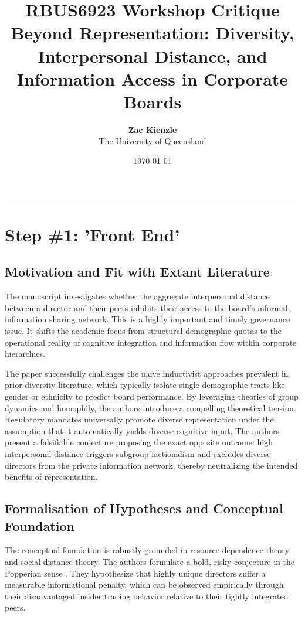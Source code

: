 \documentclass[11pt, a4paper]{article}
\title{\vspace{-2cm}\textbf{\color{uqpurple}RBUS6923 Workshop Critique}\\ \Large Beyond Representation: Diversity, Interpersonal Distance, and Information Access in Corporate Boards}
\author{\textbf{Zac Kienzle} \\ The University of Queensland}
\date{\today}
\begin{document}
\maketitle
\vspace{-1cm}
\rule{\textwidth}{0.4pt}
\vspace{0.5cm}

\section*{Step \#1: 'Front End'}

\subsection*{Motivation and Fit with Extant Literature}
The manuscript investigates whether the aggregate interpersonal distance between a director and their peers inhibits their access to the board's informal information sharing network. This is a highly important and timely governance issue. It shifts the academic focus from structural demographic quotas to the operational reality of cognitive integration and information flow within corporate hierarchies.

The paper successfully challenges the naive inductivist approaches prevalent in prior diversity literature, which typically isolate single demographic traits like gender or ethnicity to predict board performance. By leveraging theories of group dynamics and homophily, the authors introduce a compelling theoretical tension. Regulatory mandates universally promote diverse representation under the assumption that it automatically yields diverse cognitive input. The authors present a falsifiable conjecture proposing the exact opposite outcome: high interpersonal distance triggers subgroup factionalism and excludes diverse directors from the private information network, thereby neutralizing the intended benefits of representation.

\subsection*{Formalisation of Hypotheses and Conceptual Foundation}
The conceptual foundation is robustly grounded in resource dependence theory and social distance theory. The authors formulate a bold, risky conjecture in the Popperian sense \cite{popper_logic_2005}. They hypothesize that highly unique directors suffer a measurable informational penalty, which can be observed empirically through their disadvantaged insider trading behavior relative to their tightly integrated peers.
\end{document}
